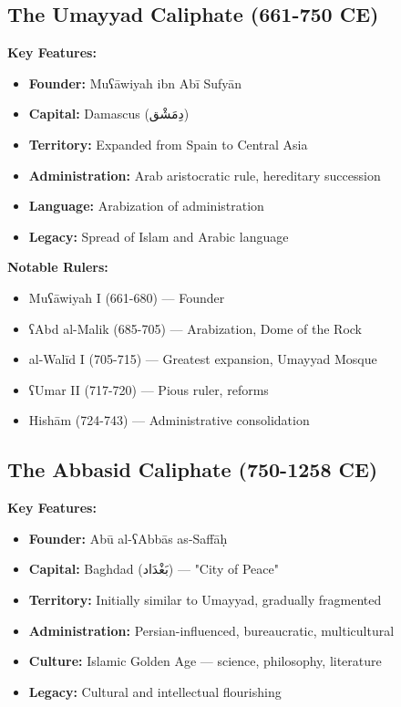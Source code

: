 \documentclass[letterpaper,12pt]{article}
\begin{document}
\begin{tcolorbox}[colback=boxcolor,colframe=accentcolor,title=\textbf{Detailed Historical Background},breakable]

\subsection*{The Umayyad Caliphate (661-750 CE)}

\textbf{Key Features:}
\begin{itemize}
\item \textbf{Founder:} Muʕāwiyah ibn Abī Sufyān
\item \textbf{Capital:} Damascus (\textarabic{دِمَشْق})
\item \textbf{Territory:} Expanded from Spain to Central Asia
\item \textbf{Administration:} Arab aristocratic rule, hereditary succession
\item \textbf{Language:} Arabization of administration
\item \textbf{Legacy:} Spread of Islam and Arabic language
\end{itemize}

\textbf{Notable Rulers:}
\begin{itemize}
\item Muʕāwiyah I (661-680) — Founder
\item ʕAbd al-Malik (685-705) — Arabization, Dome of the Rock
\item al-Walīd I (705-715) — Greatest expansion, Umayyad Mosque
\item ʕUmar II (717-720) — Pious ruler, reforms
\item Hishām (724-743) — Administrative consolidation
\end{itemize}

\subsection*{The Abbasid Caliphate (750-1258 CE)}

\textbf{Key Features:}
\begin{itemize}
\item \textbf{Founder:} Abū al-ʕAbbās as-Saffāḥ
\item \textbf{Capital:} Baghdad (\textarabic{بَغْدَاد}) — "City of Peace"
\item \textbf{Territory:} Initially similar to Umayyad, gradually fragmented
\item \textbf{Administration:} Persian-influenced, bureaucratic, multicultural
\item \textbf{Culture:} Islamic Golden Age — science, philosophy, literature
\item \textbf{Legacy:} Cultural and intellectual flourishing
\end{itemize}


\end{tcolorbox}
\end{document}
